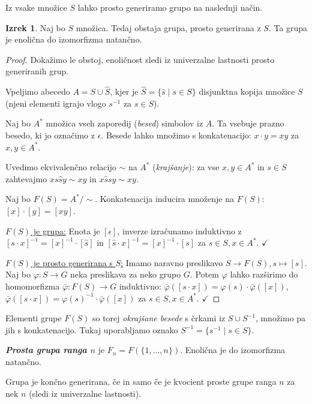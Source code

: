 \documentclass[11pt]{book}
\def\definicija{\color{rdeca}\bf\em}
\def\kljuka{$\checkmark$}
\theoremstyle{definition}
\theoremstyle{zgled}
\theoremstyle{odprtproblem}
\theoremstyle{domacanaloga}
\newenvironment{dokaz}
    {\color{siva}\begin{proof}}
    {\end{proof}}
\theoremstyle{izrek}
\newtheorem*{izrek}{Izrek}
\begin{document}
Iz vsake množice $S$ lahko prosto generiramo grupo na naslednji način.

\begin{izrek}
Naj bo $S$ množica. Tedaj obstaja grupa, prosto generirana z $S$. Ta grupa je enolična do izomorfizma natančno.
\end{izrek}

\begin{dokaz}
Dokažimo le obstoj, enoličnost sledi iz univerzalne lastnosti prosto generiranih grup.

Vpeljimo abecedo $A = S \cup \hat S$, kjer je $\hat S = \{ \hat s \mid s \in S \}$ disjunktna kopija množice $S$ (njeni elementi igrajo vlogo $s^{-1}$ za $s \in S$).

Naj bo $A^*$ množica vseh zaporedij ({\em besed}) simbolov iz $A$. Ta vsebuje prazno besedo, ki jo označimo z $\epsilon$. Besede lahko množimo s konkatenacijo: $x \cdot y = xy$ za $x,y \in A^*$.

Uvedimo ekvivalenčno relacijo $\sim$ na $A^*$ ({\em krajšanje}): za vse $x,y \in A^*$ in $s \in S$ zahtevajmo $x s \hat s y \sim xy$ in $x \hat s s y \sim xy$.

Naj bo $F(S) = A^*/\sim$. Konkatenacija inducira množenje na $F(S)$: $[x] \cdot [y] = [xy]$.

\underline{$F(S)$ je grupa:} Enota je $[\epsilon]$, inverze izračunamo induktivno z $[s \cdot x]^{-1} = [x]^{-1} \cdot [\hat s]$ in $[\hat s \cdot x]^{-1} = [x]^{-1} \cdot [s]$ za $s \in S, x \in A^*$. \kljuka

\underline{$F(S)$ je prosto generirana s $S$:} Imamo naravno preslikavo $S \to F(S), s \mapsto [s]$. Naj bo $\varphi \colon S \to G$ neka preslikava za neko grupo $G$. Potem $\varphi$ lahko razširimo do homomorfizma $\bar \varphi \colon F(S) \to G$ induktivno: $\bar \varphi([s \cdot x]) = \varphi(s) \cdot \bar \varphi([x])$, $\bar \varphi([\hat s \cdot x]) = \varphi(s)^{-1} \cdot \bar \varphi([x])$ za $s \in S, x \in A^*$. \kljuka
\end{dokaz}

Elementi grupe $F(S)$ so torej {\em okrajšane besede} s črkami iz $S \cup S^{-1}$, množimo pa jih s konkatenacijo. Tukaj uporabljamo oznako $S^{-1} = \{ s^{-1} \mid s \in S \}$.

{\definicija Prosta grupa ranga $n$} je $F_n = F(\{ 1, \dots, n \})$. Enolična je do izomorfizma natančno. 

Grupa je končno generirana, če in samo če je kvocient proste grupe ranga $n$ za nek $n$ (sledi iz univerzalne lastnosti).
\end{document}
